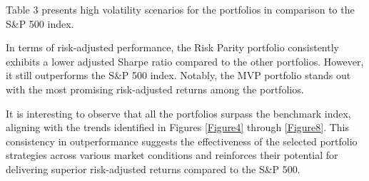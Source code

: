 \documentclass[12pt,preprint, authoryear]{elsarticle}
\numberwithin{equation}{section}
\numberwithin{figure}{section}
\numberwithin{table}{section}
\begin{document}
Table 3 presents high volatility scenarios for the portfolios in
comparison to the S\&P 500 index.

In terms of risk-adjusted performance, the Risk Parity portfolio
consistently exhibits a lower adjusted Sharpe ratio compared to the
other portfolios. However, it still outperforms the S\&P 500 index.
Notably, the MVP portfolio stands out with the most promising
risk-adjusted returns among the portfolios.

It is interesting to observe that all the portfolios surpass the
benchmark index, aligning with the trends identified in Figures
\ref{Figure4} through \ref{Figure8}. This consistency in outperformance
suggests the effectiveness of the selected portfolio strategies across
various market conditions and reinforces their potential for delivering
superior risk-adjusted returns compared to the S\&P 500.
\end{document}
